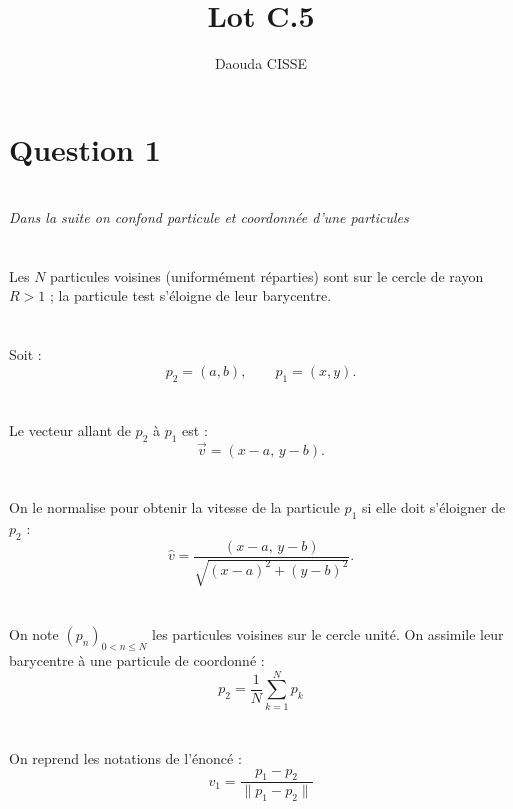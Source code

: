 \documentclass{article}
\begin{document}
\title{Lot C.5}
\author{Daouda CISSE}
\date{}
\maketitle

\section*{Question 1}

\section*{}
\textit{Dans la suite on confond particule et coordonnée d'une particules}   

\section*{}
Les $N$ particules voisines (uniformément réparties) sont sur le cercle de rayon $R > 1$ ; 
la particule test s'éloigne de leur barycentre.

\section*{}
Soit :
\[
p_2 = (a,b), \qquad p_1 = (x,y).
\]

\section*{}
Le vecteur allant de $p_2$ à $p_1$ est :
\[
\vec{v} = (x-a,\, y-b).
\]

\section*{}
On le normalise pour obtenir la vitesse de la particule $p_1$ si elle doit s'éloigner de $p_2$ :
\[
\hat{v} = \frac{(x-a,\, y-b)}{\sqrt{(x-a)^2 + (y-b)^2}}.
\]

\section*{}
On note $(p_n)_{0 < n \leq N}$ les particules voisines sur le cercle unité.
On assimile leur barycentre à une particule de coordonné :
\[
    p_2 = \frac{1}{N} \sum_{k=1}^{N} p_k
\]

\section*{}
On reprend les notations de l'énoncé :
\[
    v_1 = \frac{p_1 - p_2}{\|p_1 - p_2\|}
\]
\end{document}
